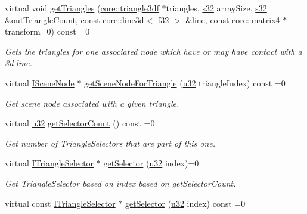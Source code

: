 \begin{DoxyCompactItemize}
virtual void \hyperlink{classirr_1_1scene_1_1ITriangleSelector_a398ca75a20cc0e44abdb13a459136720}{get\+Triangles} (\hyperlink{namespaceirr_1_1core_a8983bda2678a7a67d97bf3c7be6c31c7}{core\+::triangle3df} $\ast$triangles, \hyperlink{namespaceirr_ac66849b7a6ed16e30ebede579f9b47c6}{s32} array\+Size, \hyperlink{namespaceirr_ac66849b7a6ed16e30ebede579f9b47c6}{s32} \&out\+Triangle\+Count, const \hyperlink{classirr_1_1core_1_1line3d}{core\+::line3d}$<$ \hyperlink{namespaceirr_a0277be98d67dc26ff93b1a6a1d086b07}{f32} $>$ \&line, const \hyperlink{namespaceirr_1_1core_a4c9d4e29899535971052810954a14431}{core\+::matrix4} $\ast$transform=0) const =0
\begin{DoxyCompactList}\small\item\em Gets the triangles for one associated node which have or may have contact with a 3d line. \end{DoxyCompactList}\item 
virtual \hyperlink{classirr_1_1scene_1_1ISceneNode}{I\+Scene\+Node} $\ast$ \hyperlink{classirr_1_1scene_1_1ITriangleSelector_a9b180f4d9e273a6c1cda9afeb3b1c98b}{get\+Scene\+Node\+For\+Triangle} (\hyperlink{namespaceirr_a0416a53257075833e7002efd0a18e804}{u32} triangle\+Index) const =0
\begin{DoxyCompactList}\small\item\em Get scene node associated with a given triangle. \end{DoxyCompactList}\item 
virtual \hyperlink{namespaceirr_a0416a53257075833e7002efd0a18e804}{u32} \hyperlink{classirr_1_1scene_1_1ITriangleSelector_ae0d51279cab70e31a6aa2646e3b05df4}{get\+Selector\+Count} () const =0
\begin{DoxyCompactList}\small\item\em Get number of Triangle\+Selectors that are part of this one. \end{DoxyCompactList}\item 
virtual \hyperlink{classirr_1_1scene_1_1ITriangleSelector}{I\+Triangle\+Selector} $\ast$ \hyperlink{classirr_1_1scene_1_1ITriangleSelector_a51e15d33c41642441a311a33d2f1ebed}{get\+Selector} (\hyperlink{namespaceirr_a0416a53257075833e7002efd0a18e804}{u32} index)=0
\begin{DoxyCompactList}\small\item\em Get Triangle\+Selector based on index based on get\+Selector\+Count. \end{DoxyCompactList}\item 
virtual const \hyperlink{classirr_1_1scene_1_1ITriangleSelector}{I\+Triangle\+Selector} $\ast$ \hyperlink{classirr_1_1scene_1_1ITriangleSelector_ad5d221ea393e67872c902d35e77fa69e}{get\+Selector} (\hyperlink{namespaceirr_a0416a53257075833e7002efd0a18e804}{u32} index) const =0

\end{DoxyCompactItemize}
